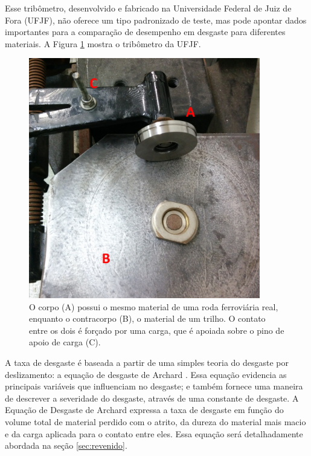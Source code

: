 \documentclass[
12pt,
openany, %
oneside, %
a4paper,			
english,			
brazil			        %
]{abntbibufjf}
\begin{document}
	Esse tribômetro, desenvolvido e fabricado na Universidade Federal de Juiz de Fora (UFJF), não oferece um tipo padronizado de teste, mas pode apontar dados importantes para a comparação de desempenho em desgaste para diferentes materiais. A Figura \ref{fig:tribometro_partes} mostra o tribômetro da UFJF.
	
	\begin{figure}[H]
		\centering
		\includegraphics[width=0.9\textwidth]{tribometro_partes}
		\caption{O corpo (A) possui o mesmo material de uma roda ferroviária real, enquanto o contracorpo (B), o material de um trilho. O contato entre os dois é forçado por uma carga, que é apoiada sobre o pino de apoio de carga (C).}
		\label{fig:tribometro_partes}
	\end{figure}

	A taxa de desgaste é baseada a partir de uma simples teoria do desgaste por deslizamento: a equação de desgaste de Archard \cite{hutchings1992tribology}. Essa equação evidencia as principais variáveis que influenciam no desgaste; e também fornece uma maneira de descrever a severidade do desgaste, através de uma constante de desgaste. A Equação de Desgaste de Archard expressa a taxa de desgaste em função do volume total de material perdido com o atrito, da dureza do material mais macio e da carga aplicada para o contato entre eles. Essa equação será detalhadamente abordada na seção \ref{sec:revenido}.
	
\end{document}
